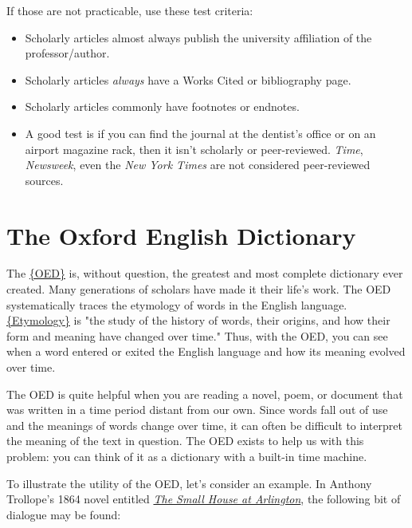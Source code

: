 \documentclass[book]{memoir}
\begin{document}
If those are not practicable, use these test criteria:
\begin{itemize}
\item Scholarly articles almost always publish the university affiliation of the professor/author. 

\item Scholarly articles \emph{always} have a Works Cited or bibliography page. 

\item Scholarly articles commonly have footnotes or endnotes. 

\item A good test is if you can find the journal at the dentist's office or on an airport magazine rack, then it isn't scholarly or peer-reviewed. \emph{Time}, \emph{Newsweek}, even the \emph{New York Times} are not considered peer-reviewed sources.
\end{itemize}

\section{The Oxford English Dictionary}

The \href{http://www.oed.com.ezproxy.bu.edu}{\{OED\}} is, without question, the greatest and most complete dictionary ever created. Many generations of scholars have made it their life's work. The OED systematically traces the etymology of words in the English language. \href{http://en.wikipedia.org/wiki/Etymology}{\{Etymology\}} is "the study of the history of words, their origins, and how their form and meaning have changed over time." Thus, with the OED, you can see when a word entered or exited the English language and how its meaning evolved over time. 

The OED is quite helpful when you are reading a novel, poem, or document that was written in a time period distant from our own. Since words fall out of use and the meanings of words change over time, it can often be difficult to interpret the meaning of the text in question. The OED exists to help us with this problem: you can think of it as a dictionary with a built-in time machine. 

To illustrate the utility of the OED, let's consider an example. In Anthony Trollope's 1864 novel entitled \href{http://www.gutenberg.org/files/4599/4599-h/4599-h.htm#c2}{\emph{The Small House at Arlington}}, the following bit of dialogue may be found:
\end{document}
